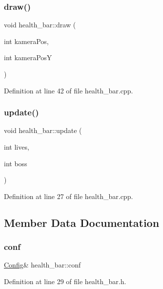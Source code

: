 \subsubsection{\texorpdfstring{draw()}{draw()}}
{\footnotesize\ttfamily void health\+\_\+bar\+::draw (\begin{DoxyParamCaption}\item[{int}]{kamera\+Pos,  }\item[{int}]{kamera\+PosY }\end{DoxyParamCaption})}



Definition at line 42 of file health\+\_\+bar.\+cpp.

\hypertarget{classhealth__bar_a1cb1380b8336ec05076b1a09376bb73b}{}\label{classhealth__bar_a1cb1380b8336ec05076b1a09376bb73b} 
\subsubsection{\texorpdfstring{update()}{update()}}
{\footnotesize\ttfamily void health\+\_\+bar\+::update (\begin{DoxyParamCaption}\item[{int}]{lives,  }\item[{int}]{boss }\end{DoxyParamCaption})}



Definition at line 27 of file health\+\_\+bar.\+cpp.



\subsection{Member Data Documentation}
\hypertarget{classhealth__bar_a9990a1716583ab2bc92dfe2b86beab1d}{}\label{classhealth__bar_a9990a1716583ab2bc92dfe2b86beab1d} 
\subsubsection{\texorpdfstring{conf}{conf}}
{\footnotesize\ttfamily \hyperlink{class_config}{Config}\& health\+\_\+bar\+::conf}



Definition at line 29 of file health\+\_\+bar.\+h.

\hypertarget{classhealth__bar_a5f5edaaf53bde6f9283e0a3fa059e4f4}{}\label{classhealth__bar_a5f5edaaf53bde6f9283e0a3fa059e4f4} 
